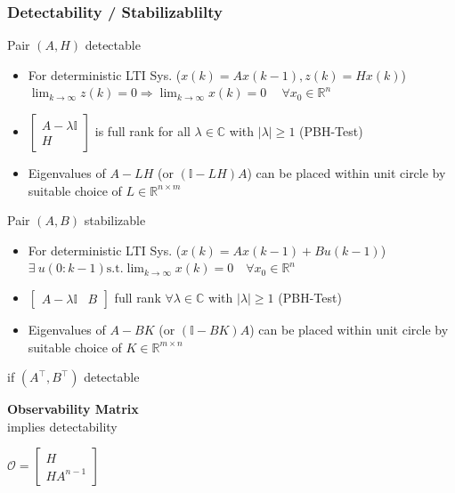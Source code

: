 \subsubsection{Detectability / Stabilizablilty}
Pair $(A,H)$ detectable
\begin{itemize}[label=$\Leftrightarrow$, leftmargin=1.6em]
    \item For deterministic LTI Sys. ($\scriptstyle x(k) = Ax(k-1), z(k) = Hx(k)$) \\
    $\lim_{k\to\infty}z(k)=0 \Rightarrow \lim_{k\to\infty}x(k)=0 \
    \quad \forall x_0 \in \mathbb{R}^n$
    \item $\left[\begin{smallmatrix}
        A - \lambda \mathbb{I} \\
        H
    \end{smallmatrix}\right]$ is full rank for all $\lambda \in \mathbb{C}$ 
    with $\lvert \lambda\rvert \geq 1$ (PBH-Test)
    \item Eigenvalues of $A-LH$ (or $(\mathbb{I}-LH)A$) can be placed within unit circle
    by suitable choice of $L\in\mathbb{R}^{n\times m}$
\end{itemize}

Pair $(A,B)$ stabilizable
\begin{itemize}[label=$\Leftrightarrow$, leftmargin=1.6em]
    \item For deterministic LTI Sys. ($\scriptstyle x(k) = Ax(k-1) + Bu(k-1)$) \\
    $\exists \ u(0:k-1) \mathrm{ s.t. } \lim_{k\to\infty}x(k)=0 
    \quad \forall x_0 \in \mathbb{R}^n$
    \item $\left[\begin{smallmatrix}
        A - \lambda \mathbb{I} & B
    \end{smallmatrix}\right]$ full rank $\forall \lambda \in \mathbb{C}$ 
    with $\lvert \lambda\rvert \geq 1$ (PBH-Test)
    \item Eigenvalues of $A-BK$ (or $(\mathbb{I}-BK)A$) can be placed within unit circle
    by suitable choice of $K\in\mathbb{R}^{m\times n}$
\end{itemize}

if $(A^\top, B^\top)$ detectable\\
\begin{minipage}[c]{0.40\linewidth}
    \textbf{Observability Matrix} \\
    implies detectability
\end{minipage}
\begin{minipage}[c]{0.3\linewidth}
    $\mathcal{O} =  \left[\begin{smallmatrix}
        H \\
        HA^{n-1}
    \end{smallmatrix}\right]$
\end{minipage}

